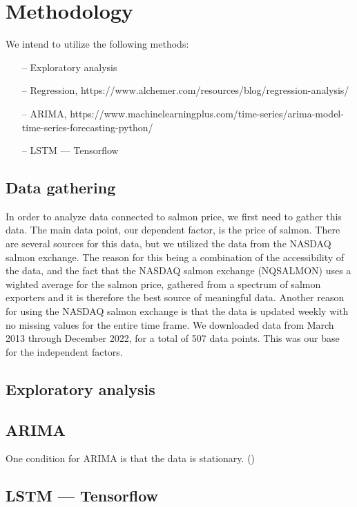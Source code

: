 \section{Methodology}

We intend to utilize the following methods:
\begin{itemize}
    \item[--] Exploratory analysis
    \item[--] Regression, https://www.alchemer.com/resources/blog/regression-analysis/
    \item[--] ARIMA, https://www.machinelearningplus.com/time-series/arima-model-time-series-forecasting-python/
    \item[--] LSTM --- Tensorflow
    \end{itemize}

\subsection{Data gathering}
In order to analyze data connected to salmon price, we first need to gather this data. 
The main data point, our dependent factor, is the price of salmon. There are several sources for this data, but we utilized the data from the NASDAQ salmon exchange.
The reason for this being a combination of the accessibility of the data, and the fact that the NASDAQ salmon exchange (NQSALMON)
uses a wighted average for the salmon price, gathered from a spectrum of salmon exporters and it is therefore the best source of meaningful data.
Another reason for using the NASDAQ salmon exchange is that the data is updated weekly with no missing values for the entire time frame.
We downloaded data from March 2013 through December 2022, for a total of 507 data points. This was our base for the independent factors.



\subsection{Exploratory analysis}

\subsection{ARIMA}
One condition for ARIMA is that the data is stationary. (\cite[p.~291]{hyndman_athanasopoulos_2021})

\subsection{LSTM --- Tensorflow}